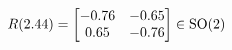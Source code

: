 \documentclass[preview]{standalone}
\begin{document}
\begin{align*}
\special{dvisvgm:raw <g id='unique000'>}R(2.44) = \begin{bmatrix} -0.76 & -0.65 \\ 0.65 & -0.76 \end{bmatrix} \in \text{SO}(2)\special{dvisvgm:raw </g>}
\end{align*}
\end{document}
